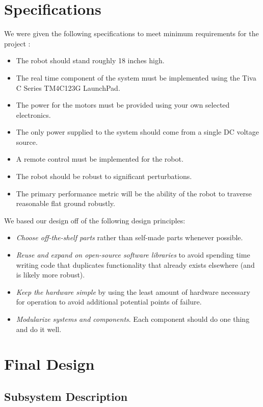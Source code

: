 \documentclass[11pt]{report}
\begin{document}
\begin{spacing}{1.5}
\section*{Specifications}
We were given the following specifications to meet minimum requirements for the project \cite{Requirements}:
\begin{itemize}[noitemsep,nolistsep]
    \item The robot should stand roughly 18 inches high.
    \item The real time component of the system must be implemented using the Tiva C Series TM4C123G LaunchPad.
    \item The power for the motors must be provided using your own selected electronics.
    \item The only power supplied to the system should come from a single DC voltage 
source.
    \item A remote control must be implemented for the robot.
    \item The robot should be robust to significant perturbations.
    \item The primary performance metric will be the ability of the robot to traverse reasonable flat ground robustly. 
\end{itemize}

We based our design off of the following design principles:
\begin{itemize}[noitemsep,nolistsep]
    \item \emph{Choose off-the-shelf parts} rather than self-made parts whenever possible.
    \item \emph{Reuse and expand on open-source software libraries} to avoid spending time writing code that duplicates functionality that already exists elsewhere (and is likely more robust).
    \item \emph{Keep the hardware simple} by using the least amount of hardware necessary for operation to avoid additional potential points of failure.
    \item \emph{Modularize systems and components}. Each component should do one thing and do it well.
\end{itemize}

\section*{Final Design}

    \subsection*{Subsystem Description}


\end{spacing}
\end{document}
